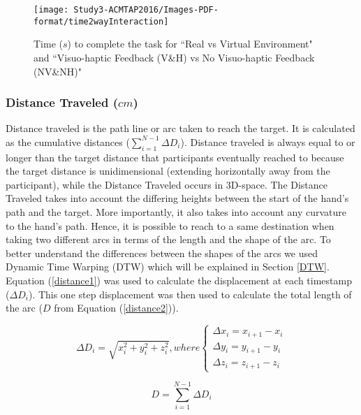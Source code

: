 \begin{figure}
	\centering
	\texttt{[image: Study3-ACMTAP2016/Images-PDF-format/time2wayInteraction]}
	\caption{\textsf{Time ($s$) to complete the task for ``Real vs Virtual Environment" and ``Visuo-haptic Feedback (V\&H) vs No Visuo-haptic Feedback (NV\&NH)"}}
	\label{fig:time2way}
\end{figure}

\subsubsection{Distance Traveled ($cm$)} \label{dist2way}
Distance traveled is the path line or arc taken to reach the target. It is calculated as the cumulative distances ($\sum_{i=1}^{N-1}\Delta D_i$). Distance traveled is always equal to or longer than the target distance that participants eventually reached to because the target distance is unidimensional (extending horizontally away from the participant), while the Distance Traveled occurs in 3D-space. The Distance Traveled takes into account the differing heights between the start of the hand's path and the target. More importantly, it also takes into account any curvature to the hand's path. Hence, it is possible to reach to a same destination when taking two different arcs in terms of the length and the shape of the arc. To better understand the differences between the shapes of the arcs we used Dynamic Time Warping (DTW) which will be explained in Section \ref{DTW}. Equation (\ref{distance1}) was used to calculate the displacement at each timestamp ($\Delta D_i$). This one step displacement was then used to calculate the total length of the arc ($D$ from Equation (\ref{distance2})). 

\begin{equation} \label{distance1}
\Delta D_i = \sqrt{x_i^2+y_i^2+z_i^2},  where  
\begin{cases}
\Delta x_i = x_{i+1}-x_{i} \\
\Delta y_i = y_{i+1}-y_{i} \\
\Delta z_i = z_{i+1}-z_{i} 
\end{cases}
\end{equation}


\begin{equation} \label{distance2}
D = \sum_{i=1}^{N-1}\Delta D_i 
\end{equation}


